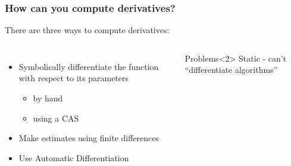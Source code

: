 \documentclass[]{article}
\begin{document}
\begin{frame}
	\frametitle{How can you compute derivatives?}
There are three ways to compute derivatives:



\begin{columns}
    \begin{itemize}
    	\item<1,2> Symbolically differentiate the function with respect to its parameters
    	\begin{itemize}
    		\item by hand
    		\item using a CAS
    	\end{itemize}
    	\item<1,3> Make estimates using finite differences
    	\item<1> Use Automatic Differentiation
    \end{itemize}

      \begin{block}{Problems}<2>
        Static - can't ``differentiate algorithms''
      \end{block}
  \end{columns}
\end{frame}
\end{document}
